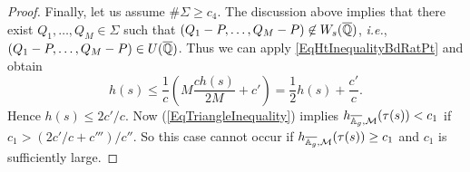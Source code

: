 \begin{proof}
Finally, let us assume $\#\Sigma \ge c_4$. %
The discussion above implies
that there exist $Q_1,\ldots,Q_M \in
\Sigma$ such that $(Q_1 - P, \ldots, Q_M-P) \not\in
W_s({\overline{\mathbb{Q}}})$, \textit{i.e.}, $(Q_1 - P, \ldots, Q_M-P)\in U({\overline{\mathbb{Q}}})$.
Thus we can apply \eqref{EqHtInequalityBdRatPt} and obtain
\begin{equation*}
  h(s) \le \frac{1}{c }\left( M\frac{c h(s)}{2M}
    +c' \right) = \frac{1}{2} h(s) + \frac{c'}{c}.
\end{equation*}
Hence
$h(s)\le  2c'/c$. Now (\ref{EqTriangleInequality}) implies
$h_{\overline{\mathbb{A}_g},{\mathcal M}}(\tau(s)) < c_1$ if $c_1 >
(2c'/c+c''')/c''$.
So this case cannot occur if
$h_{\overline{\mathbb{A}_g},{\mathcal M}}(\tau(s)) \ge c_1$ and $c_1$ is
sufficiently large. 
\end{proof}

